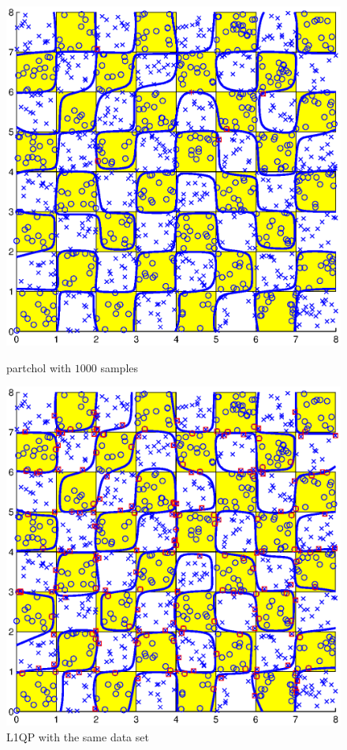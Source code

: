 \documentclass[11pt,a4paper]{article}
\theoremstyle{definition}
\begin{document}
      \begin{savenotes}\begin{figure}[htbp]
        \centering
        \begin{minipage}[t]{0.48\linewidth}
          \centering
          \includegraphics[width=1\textwidth]{2_8x8_1000.eps}
          \caption{\label{Fig:ex4_1}\textsf{partchol} with $1000$ samples}
        \end{minipage}
        \begin{minipage}[t]{0.48\linewidth}
          \centering
          \includegraphics[width=1\textwidth]{2_8x8_1000_l1qp.eps}
          \caption{\label{Fig:ex4_2}L1QP with the same data set}
        \end{minipage}
      \end{figure}\end{savenotes}
\end{document}
